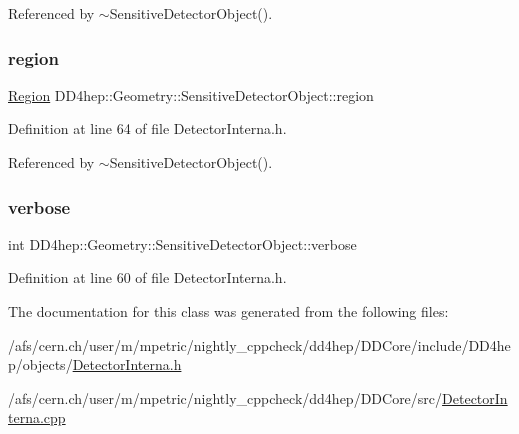 Referenced by $\sim$\+Sensitive\+Detector\+Object().

\hypertarget{class_d_d4hep_1_1_geometry_1_1_sensitive_detector_object_a022b7c934478f9778969ab16629d93c6}{}\label{class_d_d4hep_1_1_geometry_1_1_sensitive_detector_object_a022b7c934478f9778969ab16629d93c6} 
\subsubsection{\texorpdfstring{region}{region}}
{\footnotesize\ttfamily \hyperlink{class_d_d4hep_1_1_geometry_1_1_region}{Region} D\+D4hep\+::\+Geometry\+::\+Sensitive\+Detector\+Object\+::region}



Definition at line 64 of file Detector\+Interna.\+h.



Referenced by $\sim$\+Sensitive\+Detector\+Object().

\hypertarget{class_d_d4hep_1_1_geometry_1_1_sensitive_detector_object_aeb8289c1e8386dcf52041d1bae827cfa}{}\label{class_d_d4hep_1_1_geometry_1_1_sensitive_detector_object_aeb8289c1e8386dcf52041d1bae827cfa} 
\subsubsection{\texorpdfstring{verbose}{verbose}}
{\footnotesize\ttfamily int D\+D4hep\+::\+Geometry\+::\+Sensitive\+Detector\+Object\+::verbose}



Definition at line 60 of file Detector\+Interna.\+h.



The documentation for this class was generated from the following files\+:\begin{DoxyCompactItemize}
\item 
/afs/cern.\+ch/user/m/mpetric/nightly\+\_\+cppcheck/dd4hep/\+D\+D\+Core/include/\+D\+D4hep/objects/\hyperlink{_detector_interna_8h}{Detector\+Interna.\+h}\item 
/afs/cern.\+ch/user/m/mpetric/nightly\+\_\+cppcheck/dd4hep/\+D\+D\+Core/src/\hyperlink{_detector_interna_8cpp}{Detector\+Interna.\+cpp}\end{DoxyCompactItemize}
